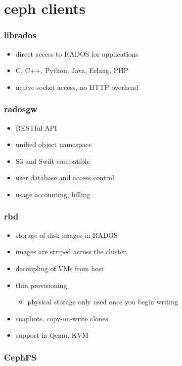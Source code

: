 \documentclass[10pt, compress]{beamer}
\begin{document}
\section{ceph clients}
\begin{frame}[fragile]
    \frametitle{librados}
    \begin{itemize}
        \item direct access to RADOS for applications
        \item C, C++, Python, Java, Erlang, PHP
        \item native socket access, no HTTP overhead
    \end{itemize}
\end{frame}

\begin{frame}[fragile]
    \frametitle{radosgw}
    \begin{itemize}
        \item RESTful API
        \item unified object namespace
        \item S3 and Swift compatible
        \item user database and access control
        \item usage accounting, billing
    \end{itemize}
\end{frame}

\begin{frame}[fragile]
    \frametitle{rbd}
    \begin{itemize}
        \item storage of disk images in RADOS
        \item images are striped across the cluster
        \item decoupling of VMs from host
        \item thin provisioning
            \begin{itemize}
                \item physical storage only used once you begin writing
            \end{itemize}
        \item snaphots, copy-on-write clones
        \item support in Qemu, KVM
    \end{itemize}
\end{frame}

\begin{frame}[fragile]
    \frametitle{CephFS}
    \begin{center}
        
    \end{center}
\end{frame}
\end{document}
